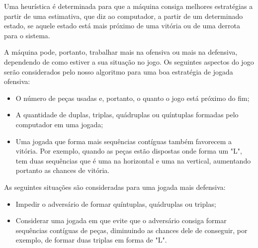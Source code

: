 \documentclass{article}
\begin{document}
        Uma heurística é determinada para que a máquina consiga melhores
        estratégias a partir de uma estimativa, que diz ao computador, a partir
        de um determinado estado, se aquele estado está mais próximo de uma
        vitória ou de uma derrota para o sistema.
        
        A máquina pode, portanto, trabalhar mais na ofensiva ou mais na
        defensiva, dependendo de como estiver a sua situação no jogo. Os
        seguintes aspectos do jogo serão considerados pelo nosso algoritmo para
        uma boa estratégia de jogada ofensiva:
        
        \begin{itemize}
            \item O número de peças usadas e, portanto, o quanto o jogo está
                próximo do fim;
            \item A quantidade de duplas, triplas, quádruplas ou quíntuplas
                formadas pelo computador em uma jogada;
            \item Uma jogada que forma mais sequências contíguas também
                favorecem a vitória. Por exemplo, quando as peças estão
                dispostas onde forma um "L", tem duas sequências que é uma na
                horizontal e uma na vertical, aumentando portanto as chances de
                vitória.
        \end{itemize}
        
        As seguintes situações são consideradas para uma jogada mais defensiva:
    
        \begin{itemize}
            \item Impedir o adversário de formar quíntuplas, quádruplas ou
                triplas;
            \item Considerar uma jogada em que evite que o adversário consiga
                formar sequências contíguas de peças, diminuindo as chances
                dele de conseguir, por exemplo, de formar duas triplas em forma
                de "L".
        \end{itemize}
        
\end{document}
